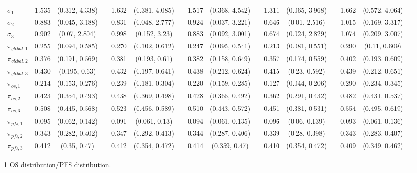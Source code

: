 \documentclass[AMA,STIX1COL]{WileyNJD-v2}
\begin{document}
\begin{landscape}
\begin{center}
\begin{table}[t]
\begin{tabular}{l c c c c c c c c c c c c c c c}
$\sigma_1$ & 1.535 & (0.312, 4.338) &  & 1.632 & (0.381, 4.085) &  & 1.517 & (0.368, 4.542) &  & 1.311 & (0.065, 3.968) &  & 1.662 & (0.572, 4.064) & \\
$\sigma_2$ & 0.883 & (0.045, 3.188) &  & 0.831 & (0.048, 2.777) &  & 0.924 & (0.037, 3.221) &  & 0.646 & (0.01, 2.516) &  & 1.015 & (0.169, 3.317) & \\
$\sigma_3$ & 0.902 & (0.07, 2.804) &  & 0.998 & (0.152, 3.23) &  & 0.883 & (0.092, 3.001) &  & 0.674 & (0.024, 2.829) &  & 1.074 & (0.209, 3.007) & \\
$\pi_{global, 1}$ & 0.255 & (0.094, 0.585) &  & 0.270 & (0.102, 0.612) &  & 0.247 & (0.095, 0.541) &  & 0.213 & (0.081, 0.551) &  & 0.290 & (0.11, 0.609) & \\
$\pi_{global, 2}$ & 0.376 & (0.191, 0.569) &  & 0.381 & (0.193, 0.61) &  & 0.382 & (0.158, 0.649) &  & 0.357 & (0.174, 0.559) &  & 0.402 & (0.193, 0.609) & \\
$\pi_{global, 3}$ & 0.430 & (0.195, 0.63) &  & 0.432 & (0.197, 0.641) &  & 0.438 & (0.212, 0.624) &  & 0.415 & (0.23, 0.592) &  & 0.439 & (0.212, 0.651) & \\
$\pi_{os, 1}$ & 0.214 & (0.153, 0.276) &  & 0.239 & (0.181, 0.304) &  & 0.220 & (0.159, 0.285) &  & 0.127 & (0.044, 0.206) &  & 0.290 & (0.234, 0.345) & \\
$\pi_{os, 2}$ & 0.423 & (0.354, 0.493) &  & 0.438 & (0.369, 0.498) &  & 0.428 & (0.365, 0.492) &  & 0.362 & (0.291, 0.432) &  & 0.482 & (0.431, 0.537) & \\
$\pi_{os, 3}$ & 0.508 & (0.445, 0.568) &  & 0.523 & (0.456, 0.589) &  & 0.510 & (0.443, 0.572) &  & 0.451 & (0.381, 0.531) &  & 0.554 & (0.495, 0.619) & \\
$\pi_{pfs, 1}$ & 0.095 & (0.062, 0.142) &  & 0.091 & (0.061, 0.13) &  & 0.094 & (0.061, 0.135) &  & 0.096 & (0.06, 0.139) &  & 0.093 & (0.061, 0.136) & \\
$\pi_{pfs, 2}$ & 0.343 & (0.282, 0.402) &  & 0.347 & (0.292, 0.413) &  & 0.344 & (0.287, 0.406) &  & 0.339 & (0.28, 0.398) &  & 0.343 & (0.283, 0.407) & \\
$\pi_{pfs, 3}$ & 0.412 & (0.35, 0.47) &  & 0.412 & (0.354, 0.472) &  & 0.414 & (0.359, 0.47) &  & 0.410 & (0.354, 0.472) &  & 0.409 & (0.349, 0.462) & \\
\bottomrule
\end{tabular}
\begin{tablenotes}%
\item[1] OS distribution/PFS distribution.
\end{tablenotes}
\end{table}
\end{center}
\end{landscape}
\end{document}
